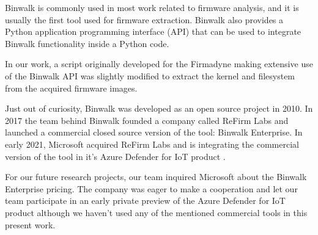 \begin{table}[h]
\centering
\caption{Example of file-type signatures (magic numbers).}
\label{tab:magic-numbers}
\end{table}


Binwalk is commonly used in most work related to firmware analysis, and it is usually the first tool used for firmware extraction. Binwalk also provides a Python application programming interface (API) that can be used to integrate Binwalk functionality inside a Python code.

In our work, a script originally developed for the Firmadyne \cite{firmadyne} making extensive use of the Binwalk API was slightly modified to extract the kernel and filesystem from the acquired firmware images.

Just out of curiosity, Binwalk was developed as an open source project in 2010. In 2017 the team behind Binwalk founded a company called ReFirm Labs and launched a commercial closed source version of the tool: Binwalk Enterprise. In early 2021, Microsoft acquired ReFirm Labs and is integrating the commercial version of the tool in it's Azure Defender for IoT product \cite{microsoft-refirmlabs}.

For our future research projects, our team inquired Microsoft about the Binwalk Enterprise pricing. The company was eager to make a cooperation and let our team participate in an early private preview of the Azure Defender for IoT product although we haven't used any of the mentioned commercial tools in this present work.

